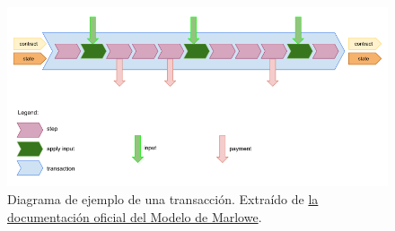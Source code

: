 \documentclass{beamer}
\begin{document}
\begin{frame}

\begin{figure}[H]
    \centering
    \includegraphics[width=\textwidth]{Transaccion.png}
    \caption[Diagrama de ejemplo de una transacción.]{Diagrama de ejemplo de una transacción. Extraído de \href{https://play.marlowe-finance.io/doc/marlowe/tutorials/marlowe-model.html}{la documentación oficial del Modelo de Marlowe}.}\label{fig:Transaccion}
\end{figure}

\end{frame}
\end{document}
